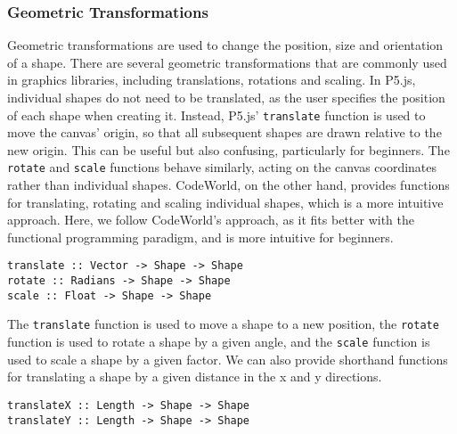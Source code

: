 \documentclass[../main.tex]{subfiles}
\begin{document}
            \subsubsection{Geometric Transformations}
                Geometric transformations are used to change the position, size and orientation
                    of a shape.
                There are several geometric transformations that are commonly used in graphics
                    libraries, including translations, rotations and scaling.
                In P5.js, individual shapes do not need to be translated, as the user specifies
                    the position of each shape when creating it.
                Instead, P5.js' \texttt{translate} function is used to move the canvas' origin,
                    so that all subsequent shapes are drawn relative to the new origin.
                This can be useful but also confusing, particularly for beginners.
                The \texttt{rotate} and \texttt{scale} functions behave similarly, acting on
                    the canvas coordinates rather than individual shapes.
                CodeWorld, on the other hand, provides functions for translating, rotating and
                    scaling individual shapes, which is a more intuitive approach.
                Here, we follow CodeWorld's approach, as it fits better with the functional
                    programming paradigm, and is more intuitive for beginners.

                \begin{lstlisting}[label={lst:geometric}, caption={The geometric transformation functions.}]
translate :: Vector -> Shape -> Shape
rotate :: Radians -> Shape -> Shape
scale :: Float -> Shape -> Shape\end{lstlisting}

                The \texttt{translate} function is used to move a shape to a new position, the
                    \texttt{rotate} function is used to rotate a shape by a given angle, and the
                    \texttt{scale} function is used to scale a shape by a given factor.
                We can also provide shorthand functions for translating a shape by a given
                    distance in the x and y directions.

                \begin{lstlisting}[label={lst:shorthandTransform}, caption={The shorthand translation functions.}]
translateX :: Length -> Shape -> Shape
translateY :: Length -> Shape -> Shape\end{lstlisting}
\end{document}
